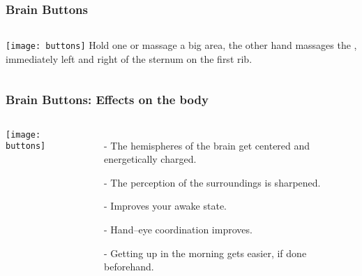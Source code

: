 \documentclass[../main.tex]{subfiles}
\begin{document}
\begin{frame}
\frametitle{Brain Buttons}


\begin{columns}[c] %

\texttt{[image: buttons]}
Hold one  or massage a big area,  the other hand massages the , immediately left and right of the sternum on the first rib. \\

\end{columns}
\end{frame}
\begin{frame}
\frametitle{Brain Buttons: Effects on the body}
\begin{columns}[c] %

\texttt{[image: buttons]}
	\begin{itemize}
	\item[-] The hemispheres of the brain get centered and energetically charged.
	\item[-] The perception of the surroundings is sharpened.
	\item[-] Improves your awake state.
	\item[-] Hand--eye coordination improves.
	\item[-] Getting up in the morning gets easier, if done beforehand.
	\end{itemize}
\end{columns}
\end{frame}
\end{document}
